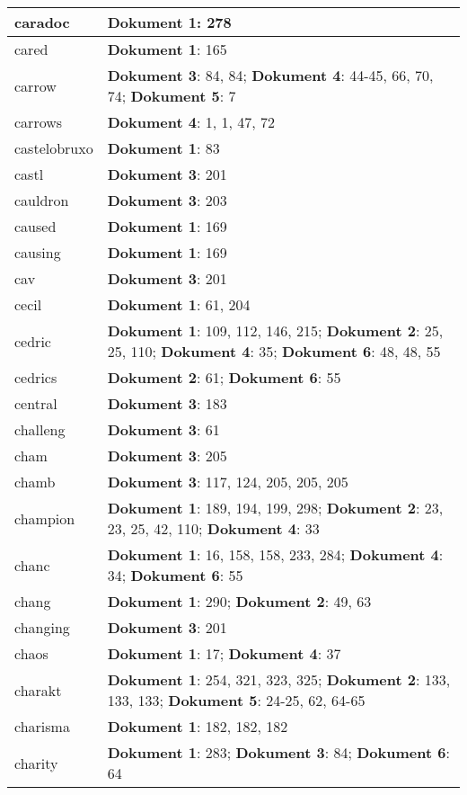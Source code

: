 \documentclass[a5paper]{article}
\begin{document}
\begin{longtable}[l]{|l|p{3in}|}
\hline
caradoc & \textbf{Dokument 1}: 278 \\
\hline
cared & \textbf{Dokument 1}: 165 \\
\hline
carrow & \textbf{Dokument 3}: 84, 84; \textbf{Dokument 4}: 44-45, 66, 70, 74; \textbf{Dokument 5}: 7 \\
\hline
carrows & \textbf{Dokument 4}: 1, 1, 47, 72 \\
\hline
castelobruxo & \textbf{Dokument 1}: 83 \\
\hline
castl & \textbf{Dokument 3}: 201 \\
\hline
cauldron & \textbf{Dokument 3}: 203 \\
\hline
caused & \textbf{Dokument 1}: 169 \\
\hline
causing & \textbf{Dokument 1}: 169 \\
\hline
cav & \textbf{Dokument 3}: 201 \\
\hline
cecil & \textbf{Dokument 1}: 61, 204 \\
\hline
cedric & \textbf{Dokument 1}: 109, 112, 146, 215; \textbf{Dokument 2}: 25, 25, 110; \textbf{Dokument 4}: 35; \textbf{Dokument 6}: 48, 48, 55 \\
\hline
cedrics & \textbf{Dokument 2}: 61; \textbf{Dokument 6}: 55 \\
\hline
central & \textbf{Dokument 3}: 183 \\
\hline
challeng & \textbf{Dokument 3}: 61 \\
\hline
cham & \textbf{Dokument 3}: 205 \\
\hline
chamb & \textbf{Dokument 3}: 117, 124, 205, 205, 205 \\
\hline
champion & \textbf{Dokument 1}: 189, 194, 199, 298; \textbf{Dokument 2}: 23, 23, 25, 42, 110; \textbf{Dokument 4}: 33 \\
\hline
chanc & \textbf{Dokument 1}: 16, 158, 158, 233, 284; \textbf{Dokument 4}: 34; \textbf{Dokument 6}: 55 \\
\hline
chang & \textbf{Dokument 1}: 290; \textbf{Dokument 2}: 49, 63 \\
\hline
changing & \textbf{Dokument 3}: 201 \\
\hline
chaos & \textbf{Dokument 1}: 17; \textbf{Dokument 4}: 37 \\
\hline
charakt & \textbf{Dokument 1}: 254, 321, 323, 325; \textbf{Dokument 2}: 133, 133, 133; \textbf{Dokument 5}: 24-25, 62, 64-65 \\
\hline
charisma & \textbf{Dokument 1}: 182, 182, 182 \\
\hline
charity & \textbf{Dokument 1}: 283; \textbf{Dokument 3}: 84; \textbf{Dokument 6}: 64 \\

\end{longtable}
\end{document}
